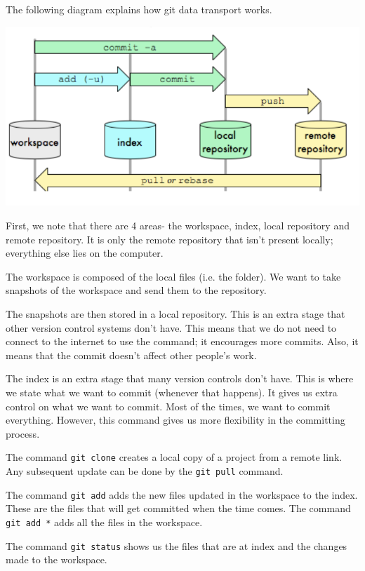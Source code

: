 \documentclass[a4paper, openany]{memoir}
\begin{document}
    The following diagram explains how git data transport works.
    \begin{center}
        \includegraphics[scale=0.6]{src/L2I1.png}
    \end{center}
    First, we note that there are 4 areas- the workspace, index, local repository and remote repository. It is only the remote repository that isn't present locally; everything else lies on the computer. 

    The workspace is composed of the local files (i.e. the folder). We want to take snapshots of the workspace and send them to the repository. 

    The snapshots are then stored in a local repository. This is an extra stage that other version control systems don't have. This means that we do not need to connect to the internet to use the command; it encourages more commits. Also, it means that the commit doesn't affect other people's work.

    The index is an extra stage that many version controls don't have. This is where we state what we want to commit (whenever that happens). It gives us extra control on what we want to commit. Most of the times, we want to commit everything. However, this command gives us more flexibility in the committing process.

    The command \texttt{git clone} creates a local copy of a project from a remote link. Any subsequent update can be done by the \texttt{git pull} command.

    The command \texttt{git add} adds the new files updated in the workspace to the index. These are the files that will get committed when the time comes. The command \texttt{git add *} adds all the files in the workspace.

    The command \texttt{git status} shows us the files that are at index and the changes made to the workspace.
\end{document}
